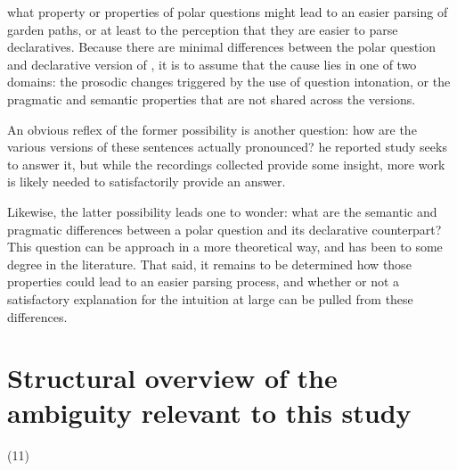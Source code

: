 \documentclass[12pt,oneside]{book}
\begin{document}
 what property or properties of polar questions might lead to an easier parsing of garden paths, or at least to the perception that they are easier to parse  declaratives. Because there are minimal differences between the polar question and declarative version of , it is  to assume that the cause lies in one of two domains: the prosodic changes triggered by the use of question intonation, or the pragmatic and semantic properties that are not shared across the versions.

An obvious reflex of the former possibility is another question: how are the various versions of these sentences actually pronounced?  he reported study seeks to answer it, but while the recordings collected provide some insight, more work is likely needed to satisfactorily provide an answer.

Likewise, the latter possibility leads one to wonder: what are the semantic and pragmatic differences between a polar question and its declarative counterpart? This question can be approach in a more theoretical way, and has been to some degree in the literature. That said, it remains to be determined how those properties could lead to an easier parsing process, and whether or not a satisfactory explanation for the intuition at large can be pulled from these differences.

\hypertarget{mech}{%
\section{Structural overview of the ambiguity relevant to this study}\label{mech}}


 (11) 
\end{document}
